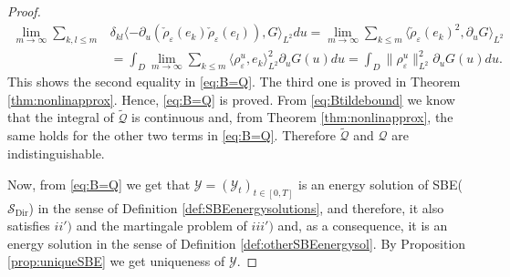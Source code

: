 \documentclass[a4paper, reqno, 12pt]{amsart}
\theoremstyle{plain}
\theoremstyle{definition}
\newcommand{\Sdir}{\mathcal{S}_{\text{Dir}}}
\begin{document}
\begin{proof}
\begin{align*}
    \lim_{m\to\infty} \sum_{k,l\leq m}  & \delta_{kl} \langle -\partial_u (\check\rho_{\varepsilon}(e_k)\check\rho_{\varepsilon}(e_l)),G \rangle_{L^2}du  = \lim_{m\to\infty} \sum_{k\leq m} \langle \check\rho_{\varepsilon}(e_k)^2, \partial_u G\rangle_{L^2}\\
    & = \int_{D}\lim_{m\to\infty} \sum_{k\leq m} \langle \rho^u_{\varepsilon},e_k\rangle_{L^2}^2  \partial_u G(u) du  = \int_{D}\|\rho^u_{\varepsilon} \|_{L^2}^2 \partial_u G(u) du .
\end{align*}
This shows the second equality in \eqref{eq:B=Q}. The third one is proved in Theorem \ref{thm:nonlinapprox}. Hence, \eqref{eq:B=Q} is proved. 
From  \eqref{eq:Btildebound} we know that the integral of $\tilde{\mathcal Q}$ is continuous and, from Theorem \ref{thm:nonlinapprox}, the same holds for the other two terms in \eqref{eq:B=Q}. Therefore $\tilde{\mathcal Q}$ and $\mathcal Q$ are indistinguishable.

Now, from \eqref{eq:B=Q} we get that $\mathcal Y=(\mathcal Y_t)_{t\in[0,T]}$ is an energy solution of SBE($\Sdir$) in the sense of Definition \ref{def:SBEenergysolutions}, and therefore, it also satisfies $ii')$ and the martingale problem of $iii')$ and, as a consequence, it is an energy solution in the sense of Definition \ref{def:otherSBEenergysol}. By Proposition \ref{prop:uniqueSBE} we get uniqueness of $\mathcal Y$.
\end{proof}
\end{document}
